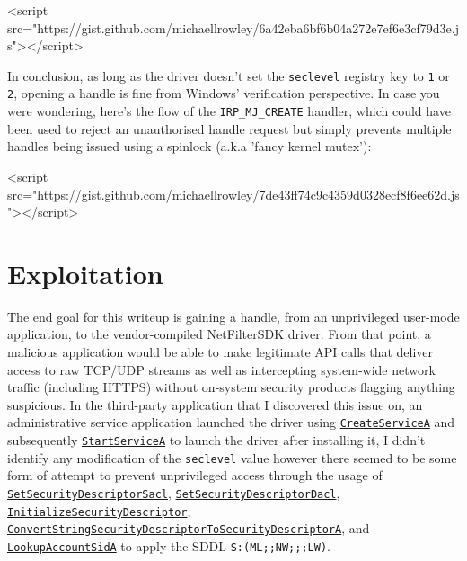 \begin{rawhtml}
<script src="https://gist.github.com/michaellrowley/6a42eba6bf6b04a272e7ef6e3cf79d3e.js"></script>
\end{rawhtml}

In conclusion, as long as the driver doesn't set the \texttt{seclevel} registry key to \texttt{1} or \texttt{2},
            opening a handle is fine from Windows' verification perspective. In case you were wondering, here's the flow of the \texttt{IRP\_MJ\_CREATE} handler, which could have
            been used to reject an unauthorised handle request but simply prevents multiple handles being issued using a spinlock (a.k.a 'fancy kernel mutex'):

\begin{rawhtml}
<script src="https://gist.github.com/michaellrowley/7de43ff74c9c4359d0328ecf8f6ee62d.js"></script>
\end{rawhtml}

\section{Exploitation}

The end goal for this writeup is gaining a handle, from an unprivileged user-mode application, to the vendor-compiled NetFilterSDK driver.
            From that point, a malicious application would be able to make legitimate API calls that deliver access to raw TCP/UDP streams as well as
            intercepting system-wide network traffic (including HTTPS) without on-system security products flagging anything suspicious.
            In the third-party application that I discovered this issue on, an administrative service application launched the driver using
            \texttt{\href{https://learn.microsoft.com/en-us/windows/win32/api/winsvc/nf-winsvc-createservicea}{CreateServiceA}}
            and subsequently \texttt{\href{https://learn.microsoft.com/en-us/windows/win32/api/winsvc/nf-winsvc-startservicea}{StartServiceA}}
            to launch the driver after installing it, I didn't identify any modification of the \texttt{seclevel} value however there seemed
            to be some form of attempt to prevent unprivileged access through the usage of \texttt{\href{https://learn.microsoft.com/en-us/windows/win32/api/securitybaseapi/nf-securitybaseapi-setsecuritydescriptorsacl}{SetSecurityDescriptorSacl}},
            \texttt{\href{https://learn.microsoft.com/en-us/windows/win32/api/securitybaseapi/nf-securitybaseapi-setsecuritydescriptordacl}{SetSecurityDescriptorDacl}}, \texttt{\href{https://learn.microsoft.com/en-us/windows/win32/api/securitybaseapi/nf-securitybaseapi-initializesecuritydescriptor}{InitializeSecurityDescriptor}},
            \texttt{\href{https://learn.microsoft.com/en-us/windows/win32/api/sddl/nf-sddl-convertstringsecuritydescriptortosecuritydescriptora}{ConvertStringSecurityDescriptorToSecurityDescriptorA}}, and \texttt{\href{https://learn.microsoft.com/en-us/windows/win32/api/winbase/nf-winbase-lookupaccountsida}{LookupAccountSidA}} to
            apply the SDDL \texttt{S:(ML;;NW;;;LW)}.

